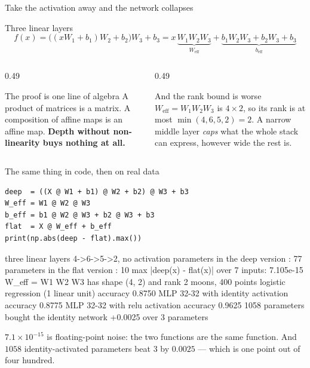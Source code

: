 \documentclass[aspectratio=169]{beamer}
\begin{document}
\begin{frame}[shrink=4]{Take the activation away and the network collapses}
  \begin{block}{Three linear layers}
    \[
      f(x) = \big((x W_1 + b_1)W_2 + b_2\big)W_3 + b_3
           = x\,\underbrace{W_1W_2W_3}_{W_{\text{eff}}}
             + \underbrace{b_1W_2W_3 + b_2W_3 + b_3}_{b_{\text{eff}}}
    \]
  \end{block}
  \begin{columns}[T]
    \begin{column}{0.49\textwidth}
      \begin{exampleblock}{The proof is one line of algebra}
        A product of matrices is a matrix. A composition of affine maps is an
        affine map. \textbf{Depth without non-linearity buys nothing at all.}
      \end{exampleblock}
    \end{column}
    \begin{column}{0.49\textwidth}
      \begin{alertblock}{And the rank bound is worse}
        $W_{\text{eff}} = W_1W_2W_3$ is $4 \times 2$, so its rank is at most
        $\min(4,6,5,2) = 2$. A narrow middle layer \emph{caps} what the whole
        stack can express, however wide the rest is.
      \end{alertblock}
    \end{column}
  \end{columns}
\end{frame}

\begin{frame}[fragile,shrink=5]{The same thing in code, then on real data}
\begin{lstlisting}
deep  = ((X @ W1 + b1) @ W2 + b2) @ W3 + b3
W_eff = W1 @ W2 @ W3
b_eff = b1 @ W2 @ W3 + b2 @ W3 + b3
flat  = X @ W_eff + b_eff
print(np.abs(deep - flat).max())
\end{lstlisting}
\begin{outblk}
three linear layers 4->6->5->2, no activation
   parameters in the deep version : 77
   parameters in the flat version : 10
   max |deep(x) - flat(x)| over 7 inputs: 7.105e-15
   W_eff = W1 W2 W3 has shape (4, 2) and rank 2
moons, 400 points
   logistic regression (1 linear unit)      accuracy 0.8750
   MLP 32-32 with identity activation       accuracy 0.8775
   MLP 32-32 with relu activation           accuracy 0.9625
   1058 parameters bought the identity network +0.0025 over 3 parameters
\end{outblk}
  \begin{center}\small
    $7.1\times10^{-15}$ is floating-point noise: the two functions are the
    same function. And $1058$ identity-activated parameters beat $3$ by
    $0.0025$ --- which is one point out of four hundred.
  \end{center}
\end{frame}
\end{document}
